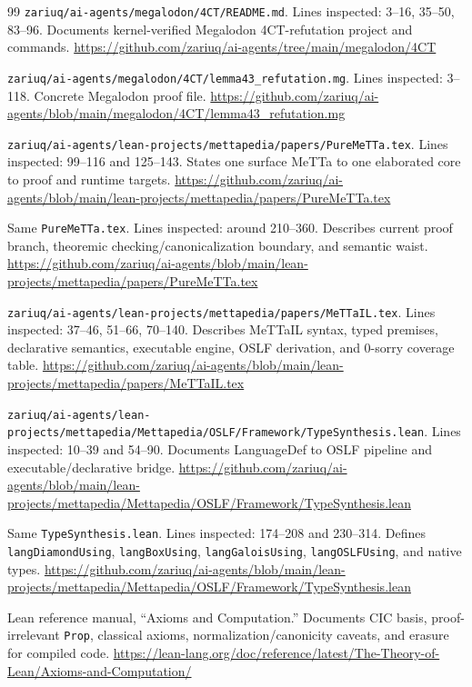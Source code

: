 \documentclass[11pt]{article}
\newcommand{\MeTTa}{\textup{MeTTa}}
\newcommand{\MeTTaIL}{\textup{MeTTaIL}}
\newcommand{\Lean}{\textup{Lean}}
\newcommand{\code}[1]{\texttt{#1}}
\begin{document}
\begin{thebibliography}{99}
\code{zariuq/ai-agents/megalodon/4CT/README.md}.  Lines inspected: 3--16, 35--50, 83--96.  Documents kernel-verified Megalodon 4CT-refutation project and commands.  \url{https://github.com/zariuq/ai-agents/tree/main/megalodon/4CT}

\code{zariuq/ai-agents/megalodon/4CT/lemma43\_refutation.mg}.  Lines inspected: 3--118.  Concrete Megalodon proof file.  \url{https://github.com/zariuq/ai-agents/blob/main/megalodon/4CT/lemma43_refutation.mg}

\code{zariuq/ai-agents/lean-projects/mettapedia/papers/PureMeTTa.tex}.  Lines inspected: 99--116 and 125--143.  States one surface \MeTTa{} to one elaborated core to proof and runtime targets.  \url{https://github.com/zariuq/ai-agents/blob/main/lean-projects/mettapedia/papers/PureMeTTa.tex}

Same \code{PureMeTTa.tex}.  Lines inspected: around 210--360.  Describes current proof branch, theoremic checking/canonicalization boundary, and semantic waist.  \url{https://github.com/zariuq/ai-agents/blob/main/lean-projects/mettapedia/papers/PureMeTTa.tex}

\code{zariuq/ai-agents/lean-projects/mettapedia/papers/MeTTaIL.tex}.  Lines inspected: 37--46, 51--66, 70--140.  Describes \MeTTaIL{} syntax, typed premises, declarative semantics, executable engine, OSLF derivation, and 0-sorry coverage table.  \url{https://github.com/zariuq/ai-agents/blob/main/lean-projects/mettapedia/papers/MeTTaIL.tex}

\code{zariuq/ai-agents/lean-projects/mettapedia/Mettapedia/OSLF/Framework/TypeSynthesis.lean}.  Lines inspected: 10--39 and 54--90.  Documents LanguageDef to OSLF pipeline and executable/declarative bridge.  \url{https://github.com/zariuq/ai-agents/blob/main/lean-projects/mettapedia/Mettapedia/OSLF/Framework/TypeSynthesis.lean}

Same \code{TypeSynthesis.lean}.  Lines inspected: 174--208 and 230--314.  Defines \code{langDiamondUsing}, \code{langBoxUsing}, \code{langGaloisUsing}, \code{langOSLFUsing}, and native types.  \url{https://github.com/zariuq/ai-agents/blob/main/lean-projects/mettapedia/Mettapedia/OSLF/Framework/TypeSynthesis.lean}

\Lean{} reference manual, ``Axioms and Computation.''  Documents CIC basis, proof-irrelevant \code{Prop}, classical axioms, normalization/canonicity caveats, and erasure for compiled code.  \url{https://lean-lang.org/doc/reference/latest/The-Theory-of-Lean/Axioms-and-Computation/}


\end{thebibliography}
\end{document}
